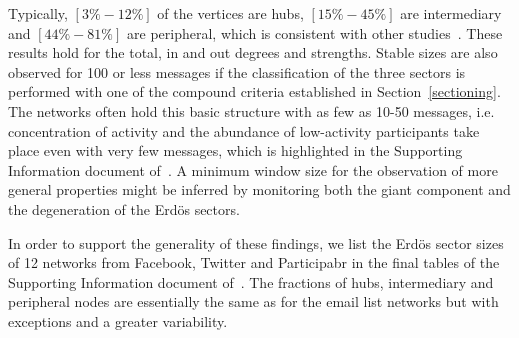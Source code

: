 														Typically, $[3\%-12\%]$ of the vertices are hubs,
														$[15\%-45\%]$ are intermediary and $[44\%-81\%]$ are peripheral,
														which is consistent with other studies~\cite{secFree}.
														These results hold for the total, in and out degrees and strengths.
														Stable sizes are also observed for 100 or less messages if the classification 
														of the three sectors is performed with one of the compound criteria established in Section~\ref{sectioning}. The networks often hold this basic structure with as few as 10-50 messages, i.e. concentration of activity and the abundance of low-activity participants take place even with very few messages, which is highlighted in the Supporting Information document of~\cite{stab}.
														A minimum window size for the observation of more general properties might be inferred by monitoring 
														both the giant component and the degeneration of the Erd\"os sectors.

														In order to support the generality of these findings,
														we list the Erd\"os sector sizes of 12 networks from Facebook, Twitter and Participabr in the final tables of the
														Supporting Information document of~\cite{stab}.
														The fractions of hubs, intermediary and peripheral nodes are
														essentially the same as for the email list networks but with exceptions and a greater variability.

